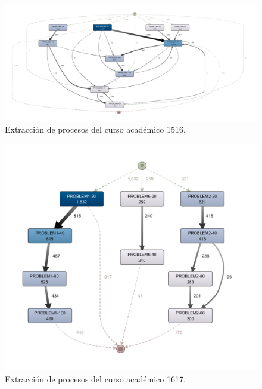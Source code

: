 \begin{figure}[H]
    \centering
    \includegraphics[width=1.25\textwidth]{imagenes/Year1516.png}
    \caption{Extracción de procesos del curso académico 1516.}
    \label{fig:año1516}
\end{figure}

\begin{figure}[H]
    \centering
    \includegraphics[width=1.25\textwidth]{imagenes/Year1617.png}
    \caption{Extracción de procesos del curso académico 1617.}
    \label{fig:año1617}
\end{figure}


